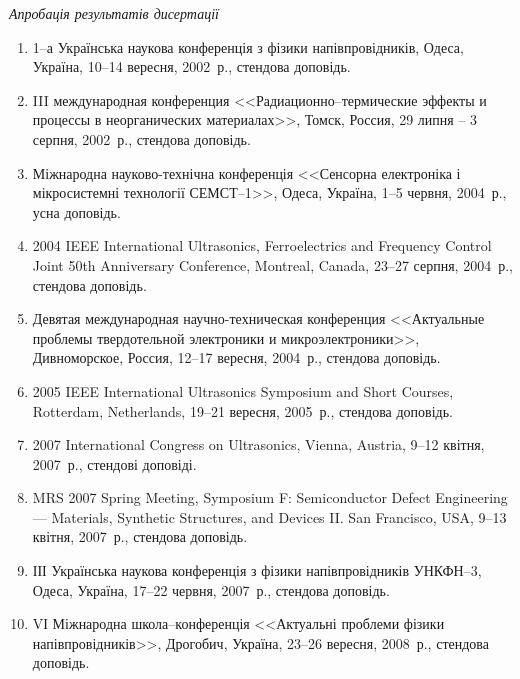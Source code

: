 \begin{center}%
\emph{Апробація результатів дисертації}
\end{center}%
\begin{enumerate}[label=\arabic*.,leftmargin=1em,itemindent=1em]

\item
1--а Українська наукова конференція з фізики напівпровідників, Одеса, Україна, 10--14 вересня, 2002~р., стендова доповідь.

\item
III международная конференция <<Радиационно--термические эффекты и процессы в неорганических материалах>>, Томск, Россия, 29 липня -- 3 серпня, 2002~р., стендова доповідь.

\item
Міжнародна науково-технічна конференція <<Сенсорна електроніка і мікросистемні технології СЕМСТ--1>>, Одеса, Україна, 1--5 червня, 2004~р., усна доповідь.

\item
2004 IEEE International Ultrasonics, Ferroelectrics and Frequency Control Joint 50th Anniversary Conference, Montreal, Canada, 23--27 серпня, 2004~р., стендова доповідь.

\item
Девятая международная научно-техническая конференция <<Актуальные проблемы твердотельной электроники и микроэлектроники>>, Дивноморское, Россия, 12--17 вересня, 2004~р., стендова доповідь.

\item
2005 IEEE International Ultrasonics Symposium and Short Courses, Rotterdam, Netherlands, 19--21 вересня, 2005~р., стендова доповідь.

\item
2007 International Congress on Ultrasonics, Vienna, Austria, 9--12 квітня, 2007~р., стендові доповіді.

\item
MRS 2007 Spring Meeting, Symposium F: Semiconductor Defect Engineering --- Materials, Synthetic Structures, and Devices II. San Francisco, USA, 9--13 квітня, 2007~р., стендова доповідь.

\item
ІІІ Українська наукова конференція з фізики напівпровідників УНКФН--3, Одеса, Україна, 17--22 червня, 2007~р., стендова доповідь.

\item
VІ Міжнародна школа--конференція <<Актуальні проблеми фізики напівпровідників>>, Дрогобич, Україна, 23--26 вересня, 2008~р., стендова доповідь.


\end{enumerate}
